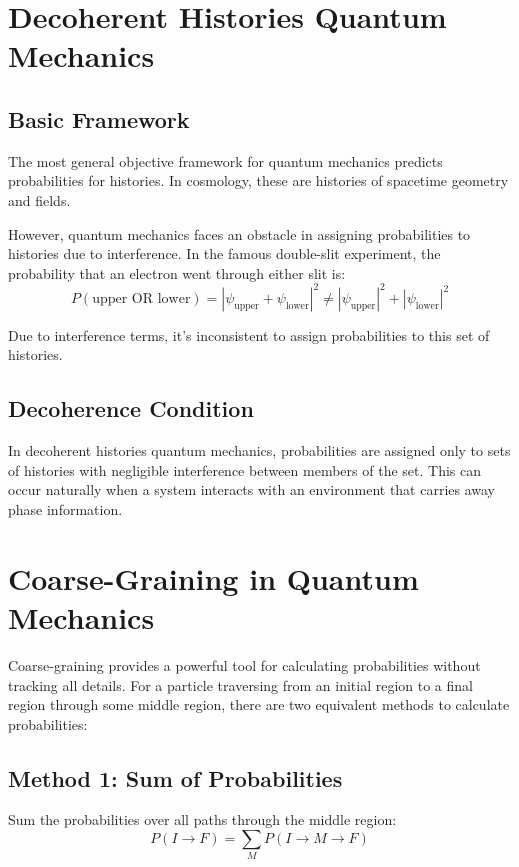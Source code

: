 \documentclass[12pt,a4paper]{article}
\begin{document}
\section{Decoherent Histories Quantum Mechanics}

\subsection{Basic Framework}

The most general objective framework for quantum mechanics predicts probabilities for histories. In cosmology, these are histories of spacetime geometry and fields.

However, quantum mechanics faces an obstacle in assigning probabilities to histories due to interference. In the famous double-slit experiment, the probability that an electron went through either slit is:
\begin{equation}
P(\text{upper OR lower}) = |\psi_{\text{upper}} + \psi_{\text{lower}}|^2 \neq |\psi_{\text{upper}}|^2 + |\psi_{\text{lower}}|^2
\end{equation}

Due to interference terms, it's inconsistent to assign probabilities to this set of histories.

\subsection{Decoherence Condition}

In decoherent histories quantum mechanics, probabilities are assigned only to sets of histories with negligible interference between members of the set. This can occur naturally when a system interacts with an environment that carries away phase information.

\section{Coarse-Graining in Quantum Mechanics}

Coarse-graining provides a powerful tool for calculating probabilities without tracking all details. For a particle traversing from an initial region to a final region through some middle region, there are two equivalent methods to calculate probabilities:

\subsection{Method 1: Sum of Probabilities}
Sum the probabilities over all paths through the middle region:
\begin{equation}
P(I \rightarrow F) = \sum_M P(I \rightarrow M \rightarrow F)
\end{equation}
\end{document}
